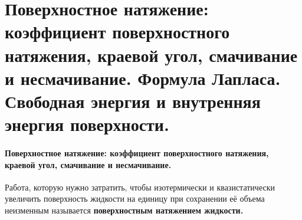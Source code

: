 \section{\normalsize Поверхностное натяжение: коэффициент поверхностного натяжения, краевой угол, смачивание и несмачивание. Формула Лапласа. Свободная энергия и внутренняя энергия поверхности.}
\paragraph{Поверхностное натяжение: коэффициент поверхностного натяжения, краевой угол, смачивание и несмачивание.} Работа, которую нужно затратить, чтобы изотермически и квазистатически увеличить поверхность жидкости на единицу при сохранении её объема неизменным называется \textbf{поверхностным натяжением жидкости.}

